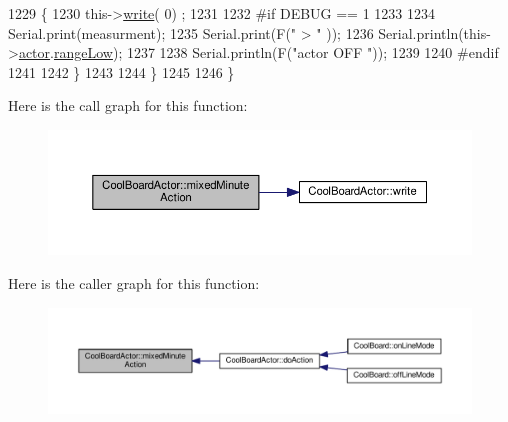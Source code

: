 \begin{DoxyCode}
1229             \{
1230                 this->\hyperlink{class_cool_board_actor_a958786ff01ea1056ee72c72d439f86da}{write}( 0) ;
1231             
1232 \textcolor{preprocessor}{            #if DEBUG == 1 }
1233 
1234                 Serial.print(measurment);
1235                 Serial.print(F(\textcolor{stringliteral}{" > "} ));
1236                 Serial.println(this->\hyperlink{class_cool_board_actor_a8f190db9f7a39fddbcef7f152da970e9}{actor}.\hyperlink{struct_cool_board_actor_1_1state_a43f891c9fb3bb63575c27cec860de55a}{rangeLow});
1237 
1238                 Serial.println(F(\textcolor{stringliteral}{"actor OFF "}));
1239 
1240 \textcolor{preprocessor}{            #endif  }
1241                 
1242             \}
1243 
1244     \}
1245 
1246 \}
\end{DoxyCode}
Here is the call graph for this function\+:\nopagebreak
\begin{figure}[H]
\begin{center}
\leavevmode
\includegraphics[width=350pt]{dc/d69/class_cool_board_actor_a2b8a79a27288d5246e3e3860ae76770d_cgraph}
\end{center}
\end{figure}
Here is the caller graph for this function\+:\nopagebreak
\begin{figure}[H]
\begin{center}
\leavevmode
\includegraphics[width=350pt]{dc/d69/class_cool_board_actor_a2b8a79a27288d5246e3e3860ae76770d_icgraph}
\end{center}
\end{figure}
\mbox{\label{class_cool_board_actor_a00b29c4abf0388551aa6812372113cf1}} 
